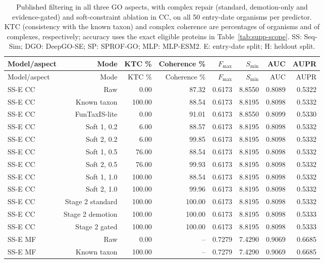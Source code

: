 \begingroup\scriptsize
\setlength{\tabcolsep}{4pt}
\begin{longtable}{lrrrrrrr}
\caption{Published filtering in all three GO aspects, with complex repair (standard, demotion-only and evidence-gated) and soft-constraint ablation in CC, on all 50 entry-date organisms per predictor. KTC (consistency with the known taxon) and complex coherence are percentages of organisms and of complexes, respectively; accuracy uses the exact eligible proteins in Table~\ref{tab:supp-scope}. SS: Seq-Sim; DGO: DeepGO-SE; SP: SPROF-GO; MLP: MLP-ESM2. E: entry-date split; H: heldout split.}\label{tab:supp-comparators}\\
\toprule
Model/aspect & Mode & KTC \% & Coherence \% & $F_{\max}$ & $S_{\min}$ & AUC & AUPR \\
\midrule
\endfirsthead
\toprule
Model/aspect & Mode & KTC \% & Coherence \% & $F_{\max}$ & $S_{\min}$ & AUC & AUPR \\
\midrule
\endhead
SS-E CC & Raw & 0.00 & 87.32 & 0.6173 & 8.8550 & 0.8089 & 0.5322 \\
SS-E CC & Known taxon & 100.00 & 88.54 & 0.6173 & 8.8195 & 0.8098 & 0.5332 \\
SS-E CC & FunTaxIS-lite & 0.00 & 91.01 & 0.6173 & 8.8550 & 0.8099 & 0.5330 \\
SS-E CC & Soft 1, 0.2 & 6.00 & 88.57 & 0.6173 & 8.8195 & 0.8098 & 0.5332 \\
SS-E CC & Soft 2, 0.2 & 6.00 & 99.85 & 0.6173 & 8.8195 & 0.8098 & 0.5332 \\
SS-E CC & Soft 1, 0.5 & 76.00 & 88.54 & 0.6173 & 8.8195 & 0.8098 & 0.5332 \\
SS-E CC & Soft 2, 0.5 & 76.00 & 99.93 & 0.6173 & 8.8195 & 0.8098 & 0.5332 \\
SS-E CC & Soft 1, 1.0 & 100.00 & 88.54 & 0.6173 & 8.8195 & 0.8098 & 0.5332 \\
SS-E CC & Soft 2, 1.0 & 100.00 & 99.96 & 0.6173 & 8.8195 & 0.8098 & 0.5332 \\
SS-E CC & Stage 2 standard & 100.00 & 100.00 & 0.6173 & 8.8195 & 0.8098 & 0.5332 \\
SS-E CC & Stage 2 demotion & 100.00 & 100.00 & 0.6173 & 8.8195 & 0.8098 & 0.5333 \\
SS-E CC & Stage 2 gated & 100.00 & 100.00 & 0.6173 & 8.8195 & 0.8098 & 0.5333 \\
SS-E MF & Raw & 0.00 & -- & 0.7279 & 7.4290 & 0.9069 & 0.6685 \\
SS-E MF & Known taxon & 100.00 & -- & 0.7279 & 7.4290 & 0.9069 & 0.6685 \\

\end{longtable}
